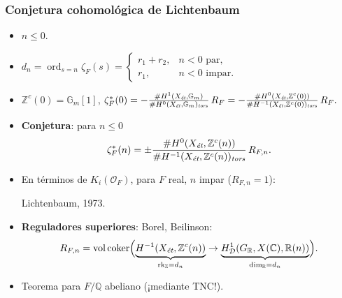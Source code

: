 \documentclass[handout]{beamer}
\newcommand{\CC}{\mathbb{C}}
\newcommand{\QQ}{\mathbb{Q}}
\newcommand{\RR}{\mathbb{R}}
\newcommand{\ZZ}{\mathbb{Z}}
\DeclareMathOperator{\coker}{coker}
\DeclareMathOperator{\ord}{ord}
\DeclareMathOperator{\rk}{rk}
\DeclareMathOperator{\vol}{vol}
\newcommand{\et}{\text{\it ét}}
\newcommand{\tors}{\text{\it tors}}
\begin{document}
\begin{frame}
  \frametitle{Conjetura cohomológica de Lichtenbaum}

  \begin{itemize}
  \item<2-> $n \le 0$.

  \item<3-> $d_n = \ord_{s = n} \zeta_F (s) = \begin{cases}
      r_1 + r_2, & n < 0\text{ par}, \\
      r_1, & n < 0\text{ impar}.
    \end{cases}$

  \item<4-> $\ZZ^c (0) = \mathbb{G}_m [1]$, $\zeta_F^* (0) = -\frac{\# H^1 (X_\et, \mathbb{G}_m)}{\# H^0 (X_\et, \mathbb{G}_m)_\tors}\,R_F = -\frac{\# H^0 (X_\et, \ZZ^c (0))}{\# H^{-1} (X_\et, \ZZ^c (0))_\tors}\,R_F.$

  \item<5-> \textbf{Conjetura}: para $n \le 0$
    \[ \zeta_F^* (n) = \pm\frac{\# H^0 (X_\et, \ZZ^c (n))}{\# H^{-1} (X_\et, \ZZ^c (n))_\tors}\,R_{F,n}. \]

  \item<6-> En términos de $K_i (\mathcal{O}_F)$, para $F$ real, $n$ impar
    ($R_{F,n} = 1$):

    Lichtenbaum, 1973.

  \item<7-> \textbf{Reguladores superiores}: Borel, Beilinson:
    \[ R_{F,n} = \vol\coker \Bigl(\underbrace{H^{-1} (X_\et, \ZZ^c(n))}_{\rk_\ZZ = d_n} \to \underbrace{H^1_\mathcal{D} (G_\RR, X(\CC), \RR(n))}_{\dim_\RR = d_n}\Bigr). \]

  \item<8-> Teorema para $F/\QQ$ abeliano (¡mediante TNC!).
  \end{itemize}
\end{frame}

\end{document}
